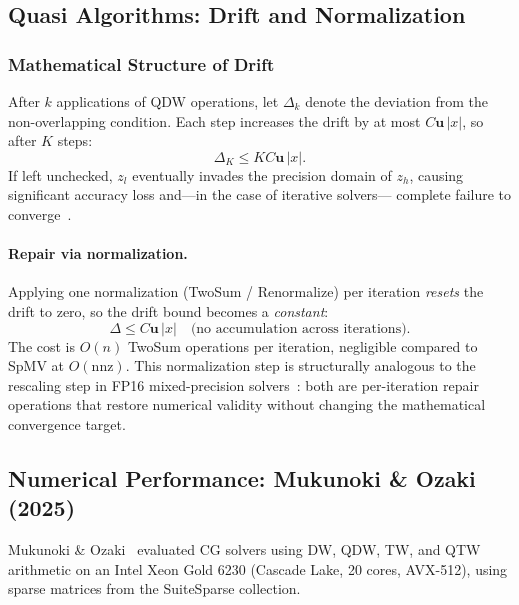 \documentclass[12pt,a4paper]{article}
\newcommand{\uu}{\mathbf{u}}
\begin{document}
\subsection{Quasi Algorithms: Drift and Normalization}
\label{sec:drift}

\subsubsection{Mathematical Structure of Drift}

After $k$ applications of QDW operations, let $\Delta_k$ denote the
deviation from the non-overlapping condition.
Each step increases the drift by at most $C\uu\,|x|$, so after $K$ steps:
\begin{equation}
  \Delta_K \leq KC\uu\,|x|.
\end{equation}
If left unchecked, $z_l$ eventually invades the precision domain of $z_h$,
causing significant accuracy loss and---in the case of iterative solvers---
complete failure to converge~\cite{Mukunoki2025}.

\paragraph{Repair via normalization.}
Applying one normalization (TwoSum / Renormalize) per iteration
\emph{resets} the drift to zero, so the drift bound becomes a \emph{constant}:
\begin{equation}
  \Delta \leq C\uu\,|x| \quad \text{(no accumulation across iterations)}.
\end{equation}
The cost is $O(n)$ TwoSum operations per iteration, negligible compared
to SpMV at $O(\mathrm{nnz})$. This normalization step is structurally analogous
to the rescaling step in FP16 mixed-precision solvers~\cite{Kanamori2026}: both
are per-iteration repair operations that restore numerical validity without
changing the mathematical convergence target.

\subsection{Numerical Performance: Mukunoki \& Ozaki (2025)}
\label{sec:mukunoki}

Mukunoki \& Ozaki~\cite{Mukunoki2025} evaluated CG solvers using DW, QDW, TW, and QTW
arithmetic on an Intel Xeon Gold 6230 (Cascade Lake, 20 cores, AVX-512),
using sparse matrices from the SuiteSparse collection.
\end{document}
